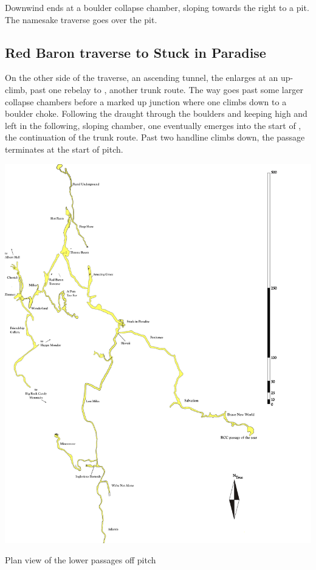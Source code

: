 Downwind ends at a boulder collapse   chamber, sloping towards the right to a pit. The namesake traverse goes over the pit.

\subsection{Red Baron traverse to Stuck in Paradise}
On the other side of the traverse, an ascending tunnel, the  enlarges at an up- climb, past one rebelay to , another trunk route. The way goes past some larger collapse chambers before a marked up junction where one climbs down to a boulder choke. Following the draught through the boulders and keeping high and left in the following, sloping chamber, one eventually emerges into the start of , the continuation of the trunk route. Past two handline climbs down, the passage terminates at the start of  pitch.

\begin{pagesurvey}
\checkoddpage \ifoddpage \forcerectofloat \else \forceversofloat \fi
\centering
\includegraphics[width=\textwidth]{images/pdf_maps/paradise.pdf}
\caption[Below Cheetah]{Plan view of the lower passages off \protect{} pitch}
\label{paradise}
\end{pagesurvey}


